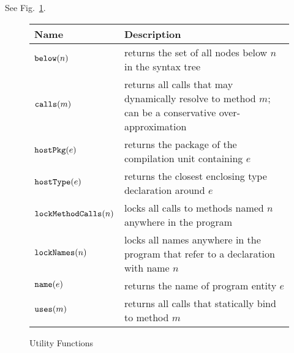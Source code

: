 See Fig.~\ref{fig:utility}.

\begin{figure}
\begin{center}
\begin{tabular}{|l|p{5.3cm}|}
\hline
\textbf{Name} & \textbf{Description} \\ \hline\hline
$\text{\texttt{below}}(n)$ & returns the set of all nodes below $n$ in the syntax tree \\
$\text{\texttt{calls}}(m)$ & returns all calls that may dynamically resolve to method $m$; can be a conservative over-approximation \\
$\text{\texttt{hostPkg}}(e)$ & returns the package of the compilation unit containing $e$ \\
$\text{\texttt{hostType}}(e)$ & returns the closest enclosing type declaration around $e$ \\
$\text{\texttt{lockMethodCalls}}(n)$ & locks all calls to methods named $n$ anywhere in the program \\
$\text{\texttt{lockNames}}(n)$ & locks all names anywhere in the program that refer to a declaration with name $n$ \\
$\text{\texttt{name}}(e)$ & returns the name of program entity $e$ \\
$\text{\texttt{uses}}(m)$ & returns all calls that statically bind to method $m$ \\
\hline
\end{tabular}
\end{center}
\caption{Utility Functions}
\label{fig:utility}
\end{figure}
